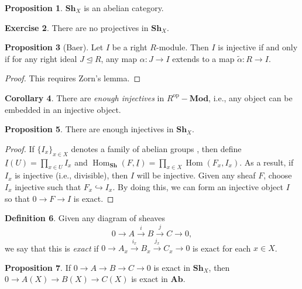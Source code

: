\documentclass[10pt,letterpaper,cm]{nupset}
\theoremstyle{definition}
\newtheorem{definition}{Definition}[subsection]
\theoremstyle{theorem}
\newtheorem{prop}[definition]{Proposition}
\newtheorem{corollary}[definition]{Corollary}
\newtheorem{exercise}[definition]{Exercise}
\theoremstyle{remark}
\newcommand{\1}{\mathbb{1}}
\newcommand{\0}{\vec 0}
\DeclareMathOperator{\Hom}{Hom}
\DeclareMathOperator{\op}{op}
\begin{document}
\begin{prop}
$\mathbf{Sh}_{X}$ is an abelian category. 
\end{prop}

\begin{exercise}
There are no projectives in $\mathbf{Sh}_{X}$.
\end{exercise}

\begin{prop}[Baer]
Let $I$ be a right $R$-module. Then $I$ is injective if and only if for any right ideal $J \unlhd R$, any map $\alpha : J \to I$ extends to a map $\tilde{\alpha} : R \to I$.
\end{prop}
\begin{proof}
This requires Zorn's lemma.
\end{proof}

\begin{corollary}
There are \textit{enough injectives} in $R^{\op}{-}\mathbf{Mod}$, i.e., any object can be embedded in an injective object. 
\end{corollary}

\begin{prop}
There are enough injectives in $\mathbf{Sh}_{X}$. 
\end{prop}
\begin{proof}
If $\{I_x\}_{x\in X}$ denotes a family of abelian groups , then define $\underline{I}(U) = \prod_{x\in U} I_x$ and $\Hom_{\mathbf{Sh}}(F, \underline{I}) = \prod_{x\in X} \Hom(F_x, I_x)$. As a result, if $I_x$ is injective (i.e., divisible), then $I$ will be injective. Given any sheaf $F$, choose $I_x$ injective such that $F_x \hookrightarrow I_x$. By doing this, we can form an injective object $I$ so that $0 \to F \to I$ is exact. 
\end{proof}

\begin{definition}
Given any diagram of sheaves $$  0 \to A \overset{i}{\longrightarrow} B \overset{j}{\longrightarrow} C \to 0  ,$$ we say that this is \textit{exact} if $0 \to A_x  \overset{i_x}{\longrightarrow}  B_x  \overset{j_x}{\longrightarrow}  C_x \to 0$ is exact for each $x\in X$. 
\end{definition}

\begin{prop}
If $0 \to A \to B \to C \to 0$ is exact in $\mathbf{Sh}_{X}$, then $0 \to A(X) \to B(X) \to C(X)$ is exact in $\mathbf{Ab}$.
\end{prop}
\end{document}
